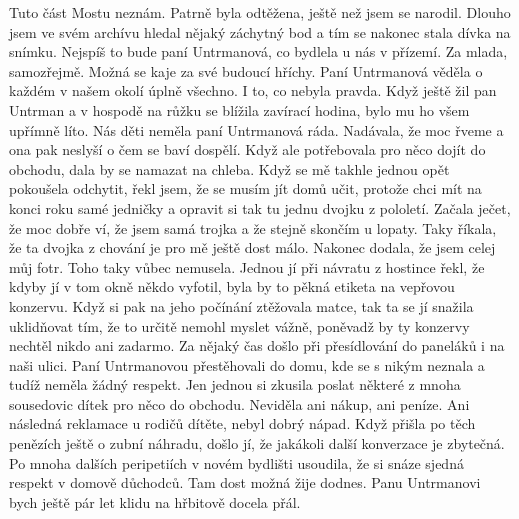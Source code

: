 
Tuto část Mostu neznám. Patrně byla odtěžena, ještě než jsem se
narodil. Dlouho jsem ve svém archívu hledal nějaký záchytný bod a tím
se nakonec stala dívka na snímku. Nejspíš to bude paní Untrmanová, co
bydlela u nás v přízemí. Za mlada, samozřejmě. Možná se kaje za své
budoucí hříchy. Paní Untrmanová věděla o každém v našem okolí úplně
všechno. I to, co nebyla pravda. Když ještě žil pan Untrman a v
hospodě na růžku se blížila zavírací hodina, bylo mu ho všem upřímně
líto. Nás děti neměla paní Untrmanová ráda. Nadávala, že moc řveme a
ona pak neslyší o čem se baví dospělí. Když ale potřebovala pro něco
dojít do obchodu, dala by se namazat na chleba. Když se mě takhle
jednou opět pokoušela odchytit, řekl jsem, že se musím jít domů učit,
protože chci mít na konci roku samé jedničky a opravit si tak tu jednu
dvojku z pololetí. Začala ječet, že moc dobře ví, že jsem samá trojka
a že stejně skončím u lopaty. Taky říkala, že ta dvojka z chování je
pro mě ještě dost málo. Nakonec dodala, že jsem celej můj fotr. Toho
taky vůbec nemusela. Jednou jí při návratu z hostince řekl, že kdyby
jí v tom okně někdo vyfotil, byla by to pěkná etiketa na vepřovou
konzervu. Když si pak na jeho počínání ztěžovala matce, tak ta se jí
snažila uklidňovat tím, že to určitě nemohl myslet vážně, poněvadž by
ty konzervy nechtěl nikdo ani zadarmo. Za nějaký čas došlo při
přesídlování do paneláků i na naši ulici. Paní Untrmanovou
přestěhovali do domu, kde se s nikým neznala a tudíž neměla žádný
respekt. Jen jednou si zkusila poslat některé z mnoha sousedovic dítek
pro něco do obchodu. Neviděla ani nákup, ani peníze. Ani následná
reklamace u rodičů dítěte, nebyl dobrý nápad. Když přišla po těch
penězích ještě o zubní náhradu, došlo jí, že jakákoli další konverzace
je zbytečná. Po mnoha dalších peripetiích v novém bydlišti usoudila,
že si snáze sjedná respekt v domově důchodců. Tam dost možná žije
dodnes. Panu Untrmanovi bych ještě pár let klidu na hřbitově docela
přál.

